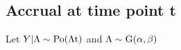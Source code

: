 % 
% 


\subsection{Accrual at time point t}
Let $Y|\Lambda \sim \rm{Po}(\Lambda t)$ and $\Lambda \sim \rm{G}(\alpha,\beta)$









